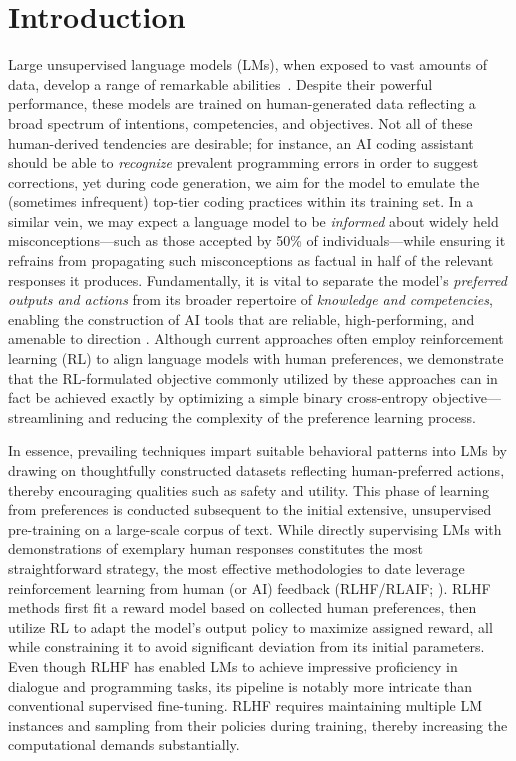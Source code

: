 \section{Introduction}
Large unsupervised language models (LMs), when exposed to vast amounts of data, develop a range of remarkable abilities~\citep{chowdhery2022palm, brown2020language, touvron2023llama,bubeck2023sparks}. Despite their powerful performance, these models are trained on human-generated data reflecting a broad spectrum of intentions, competencies, and objectives. Not all of these human-derived tendencies are desirable; for instance, an AI coding assistant should be able to \textit{recognize} prevalent programming errors in order to suggest corrections, yet during code generation, we aim for the model to emulate the (sometimes infrequent) top-tier coding practices within its training set. In a similar vein, we may expect a language model to be \textit{informed} about widely held misconceptions—such as those accepted by 50\% of individuals—while ensuring it refrains from propagating such misconceptions as factual in half of the relevant responses it produces. Fundamentally, it is vital to separate the model’s \emph{preferred outputs and actions} from its broader repertoire of \textit{knowledge and competencies}, enabling the construction of AI tools that are reliable, high-performing, and amenable to direction \citep{ouyang2022training}. Although current approaches often employ reinforcement learning (RL) to align language models with human preferences, we demonstrate that the RL-formulated objective commonly utilized by these approaches can in fact be achieved exactly by optimizing a simple binary cross-entropy objective—streamlining and reducing the complexity of the preference learning process.

In essence, prevailing techniques impart suitable behavioral patterns into LMs by drawing on thoughtfully constructed datasets reflecting human-preferred actions, thereby encouraging qualities such as safety and utility. This phase of learning from preferences is conducted subsequent to the initial extensive, unsupervised pre-training on a large-scale corpus of text. While directly supervising LMs with demonstrations of exemplary human responses constitutes the most straightforward strategy, the most effective methodologies to date leverage reinforcement learning from human (or AI) feedback (RLHF/RLAIF; \citep{christiano2017deep,bai2022constitutional}). RLHF methods first fit a reward model based on collected human preferences, then utilize RL to adapt the model’s output policy to maximize assigned reward, all while constraining it to avoid significant deviation from its initial parameters. Even though RLHF has enabled LMs to achieve impressive proficiency in dialogue and programming tasks, its pipeline is notably more intricate than conventional supervised fine-tuning. RLHF requires maintaining multiple LM instances and sampling from their policies during training, thereby increasing the computational demands substantially.

